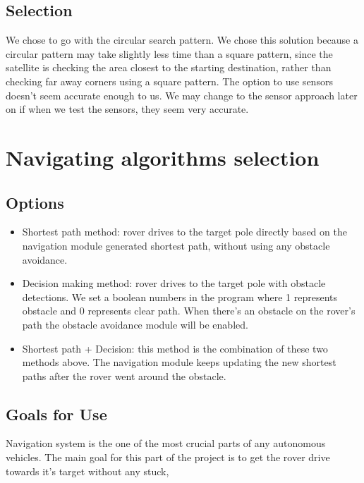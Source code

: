 \documentclass[10pt,letterpaper,onecolumn,journal]{IEEEtran}
\begin{document}
\subsection{Selection}
We chose to go with the circular search pattern. We chose this solution because a circular pattern may take slightly less time than a square pattern, since the satellite is checking the area closest to the starting destination, rather than checking far away corners using a square pattern. The option to use sensors doesn’t seem accurate enough to us. We may change to the sensor approach later on if when we test the sensors, they seem very accurate.

\section{Navigating algorithms selection}

\subsection{Options}
\begin{itemize}
	\item Shortest path method: rover drives to the target pole directly based on the navigation module generated shortest path, without using any obstacle avoidance.
	
	\item Decision making method: rover drives to the target pole with obstacle detections. We set a boolean numbers in the program where 1 represents obstacle and 0 represents clear path. When there's an obstacle on the rover's path the obstacle avoidance module will be enabled. \cite{astarkfuture}
	
	\item Shortest path + Decision: this method is the combination of these two methods above. The navigation module keeps updating the new shortest paths after the rover went around the obstacle.\cite{Dhanasingaraja}
\end{itemize}
\subsection{Goals for Use}
Navigation system is the one of the most crucial parts of any autonomous vehicles. The main goal for this part of the project is to get the rover drive towards it's target without any stuck,   
\end{document}
